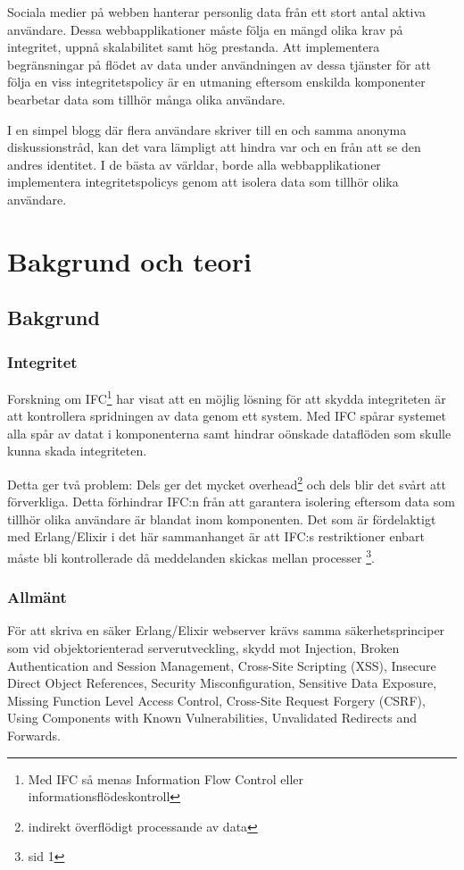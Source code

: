\documentclass[12pt]{article}
\begin{document}
Sociala medier på webben hanterar personlig data från ett stort antal aktiva användare.
Dessa webbapplikationer måste följa en mängd olika krav på integritet, uppnå skalabilitet samt hög prestanda.
Att implementera begränsningar på flödet av data under användningen av dessa tjänster för att följa en viss integritetspolicy är en utmaning eftersom enskilda komponenter bearbetar data som tillhör många olika användare.

I en simpel blogg där flera användare skriver till en och samma anonyma diskussionstråd, kan det vara lämpligt att hindra var och en från att se den andres identitet.
I de bästa av världar, borde alla webbapplikationer implementera integritetspolicys genom att isolera data som tillhör olika användare.



 \section{Bakgrund och teori}

\subsection{Bakgrund}

\subsubsection*{Integritet}


Forskning om IFC\footnote{Med IFC så menas Information Flow Control eller informationsflödeskontroll} har visat att en möjlig lösning för att skydda integriteten är att kontrollera spridningen av data genom ett system.
Med IFC spårar systemet alla spår av datat i komponenterna samt hindrar oönskade dataflöden som skulle kunna skada integriteten.

Detta ger två problem:
Dels ger det mycket overhead\footnote{indirekt överflödigt processande av data} och dels blir det svårt att förverkliga.
Detta förhindrar IFC:n från att garantera isolering eftersom data som tillhör olika användare är blandat inom komponenten.
Det som är fördelaktigt med Erlang/Elixir i det här sammanhanget är att IFC:s restriktioner enbart måste bli kontrollerade då meddelanden skickas mellan processer \footnote{sid 1\cite{IFC}}.
\subsubsection*{Allmänt}
	För att skriva en säker Erlang/Elixir webserver krävs samma säkerhetsprinciper som vid objektorienterad serverutveckling, skydd mot Injection, Broken Authentication and Session Management, Cross-Site Scripting (XSS), Insecure Direct Object References, Security Misconfiguration, Sensitive Data Exposure, Missing Function Level Access Control, Cross-Site Request Forgery (CSRF), Using Components with Known Vulnerabilities, Unvalidated Redirects and Forwards\cite{owasp}.
\end{document}
